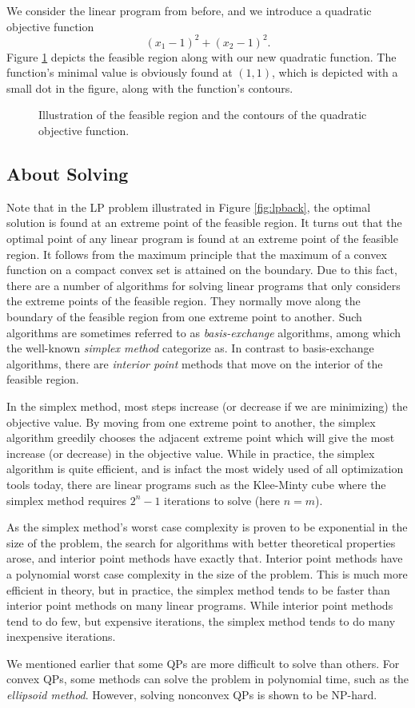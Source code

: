 We consider the linear program from before, and we introduce a quadratic
objective function
\[
(x_1 - 1)^2 + (x_2 - 1)^2.
\]
Figure \ref{fig:qpback} depicts the feasible region along with our new
quadratic function.
The function's minimal value is obviously found at $(1,1)$, which is
depicted with a small dot in the figure, along with the function's contours.
\begin{figure}[ht!]
\centering

\caption{Illustration of the feasible region and the contours of the quadratic
         objective function.}
\label{fig:qpback}
\end{figure}

\subsection{About Solving}
Note that in the LP problem illustrated in Figure \ref{fig:lpback},
the optimal solution is found at an extreme point
of the feasible region. It turns out that the optimal point of any linear program is
found at an extreme point of the feasible region.
It follows from the maximum principle that the maximum of a convex function on
a compact convex set is attained on the boundary\cite{rockafellar}.
Due to this fact, there are a number of algorithms for solving linear
programs that only considers the extreme points of the feasible region.
They normally move along the boundary of the feasible region from one extreme
point to another.
Such algorithms are sometimes referred to as \textit{basis-exchange} algorithms,
among which the well-known \textit{simplex method} categorize as.
In contrast to basis-exchange algorithms, there are \textit{interior point} methods
that move on the interior of the feasible region.

In the simplex method, most steps increase (or decrease if we are minimizing) the
objective value. By moving from one extreme point to another, the simplex algorithm
greedily chooses the adjacent extreme point which will give the most increase
(or decrease) in the objective value. 
While in practice, the simplex algorithm is quite efficient, and is infact
the most widely used of all optimization tools today\cite{nocedal}, there are
linear programs such as the Klee-Minty cube\cite{klee} where the simplex method
requires $2^n - 1$ iterations to solve (here $n = m$).

As the simplex method's worst case complexity is proven to be exponential
in the size of the problem, the search for algorithms with better theoretical
properties arose, and interior point methods have exactly that.
Interior point methods have a polynomial worst case
complexity in the size of the problem. This is much more efficient in
theory, but in practice, the simplex method tends to be faster than interior
point methods on many linear programs. While interior point methods tend
to do few, but expensive iterations, the simplex method tends to do
many inexpensive iterations.

We mentioned earlier that some QPs are more difficult to solve than others.
For convex QPs, some methods can solve the problem in polynomial time, such
as the \textit{ellipsoid method}\cite{kozlov}. However, solving nonconvex
QPs is shown to be NP-hard\cite{sahni}.
